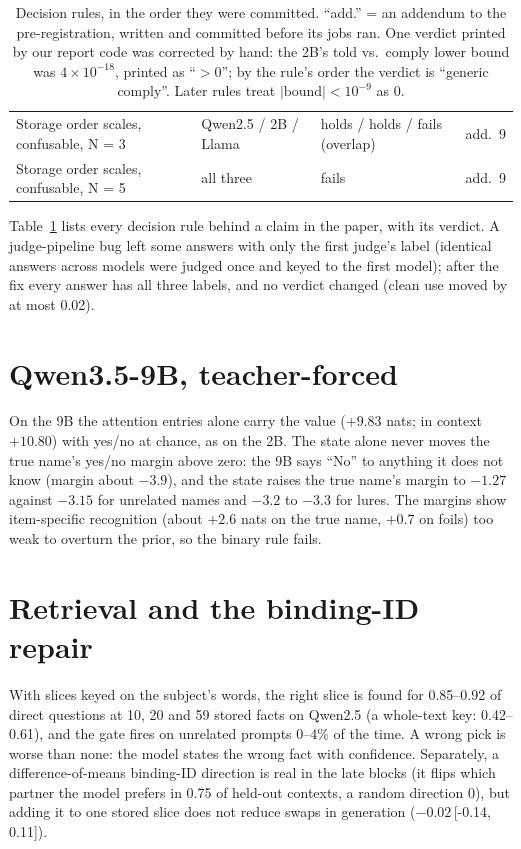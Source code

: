 \documentclass[11pt]{article}
\newcommand{\ci}[2]{\,{\scriptsize[#1,\,#2]}}
\begin{document}
\begin{table}[t]
{\begin{tabular}{@{}p{}lll@{}}
Storage order scales, confusable, N = 3 & Qwen2.5 / 2B / Llama & holds / holds / fails (overlap) & add.\ 9 \\
Storage order scales, confusable, N = 5 & all three & fails & add.\ 9 \\
\bottomrule
\end{tabular}}
\caption{Decision rules, in the order they were committed. ``add.'' = an addendum to the pre-registration, written
and committed before its jobs ran. One verdict printed by our report code was corrected by hand: the 2B's told vs.\
comply lower bound was $4{\times}10^{-18}$, printed as ``$>0$''; by the rule's order the verdict is ``generic
comply''. Later rules treat $|\text{bound}|<10^{-9}$ as 0.}
\label{tab:prereg}
\end{table}

Table~\ref{tab:prereg} lists every decision rule behind a claim in the paper, with its verdict. A judge-pipeline bug
left some answers with only the first judge's label (identical answers across models were judged once and keyed to the
first model); after the fix every answer has all three labels, and no verdict changed (clean use moved by at most 0.02).

\section{Qwen3.5-9B, teacher-forced}
\label{app:9b}

On the 9B the attention entries alone carry the value ($+9.83$ nats; in context $+10.80$) with yes/no at chance, as on
the 2B. The state alone never moves the true name's yes/no margin above zero: the 9B says ``No'' to anything it does
not know (margin about $-3.9$), and the state raises the true name's margin to $-1.27$ against $-3.15$ for unrelated
names and $-3.2$ to $-3.3$ for lures. The margins show item-specific recognition (about $+2.6$ nats on the true name,
$+0.7$ on foils) too weak to overturn the prior, so the binary rule fails.

\section{Retrieval and the binding-ID repair}
\label{app:retrieval}

With slices keyed on the subject's words, the right slice is found for 0.85--0.92 of direct questions at 10, 20 and
59 stored facts on Qwen2.5 (a whole-text key: 0.42--0.61), and the gate fires on unrelated prompts 0--4\% of the time.
A wrong pick is worse than none: the model states the wrong fact with confidence. Separately, a difference-of-means
binding-ID direction is real in the late blocks (it flips which partner the model prefers in 0.75 of held-out
contexts, a random direction 0), but adding it to one stored slice does not reduce swaps in generation
($-0.02$\ci{-0.14}{0.11}).
\end{document}
